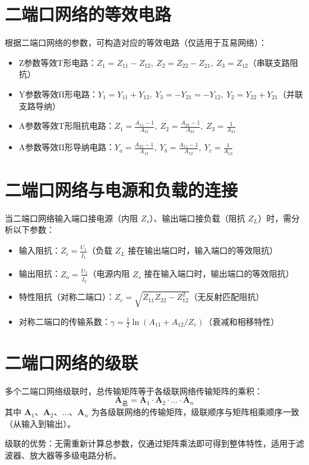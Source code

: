 \section{二端口网络的等效电路}
根据二端口网络的参数，可构造对应的等效电路（仅适用于互易网络）：
\begin{itemize}
    \item Z参数等效T形电路：$Z_1=Z_{11}-Z_{12},\ Z_2=Z_{22}-Z_{21},\ Z_3=Z_{12}$（串联支路阻抗）
    \item Y参数等效Π形电路：$Y_1=Y_{11}+Y_{12},\ Y_3=-Y_{21}=-Y_{12},\ Y_2=Y_{22}+Y_{21}$（并联支路导纳）
    \item A参数等效T形阻抗电路：$Z_1=\frac{A_{11}-1}{A_{21}},\ Z_2=\frac{A_{22}-1}{A_{21}},\ Z_3=\frac{1}{A_{21}}$
    \item A参数等效Π形导纳电路：$Y_a=\frac{A_{22}-1}{A_{12}},\ Y_b=\frac{A_{11}-1}{A_{12}},\ Y_c=\frac{1}{A_{12}}$
\end{itemize}

\section{二端口网络与电源和负载的连接}
当二端口网络输入端口接电源（内阻 $Z_s$）、输出端口接负载（阻抗 $Z_L$）时，需分析以下参数：
\begin{itemize}
    \item 输入阻抗：$Z_i = \frac{\dot{U}_1}{\dot{I}_1}$（负载 $Z_L$ 接在输出端口时，输入端口的等效阻抗）
    \item 输出阻抗：$Z_o = \frac{\dot{U}_2}{\dot{I}_2}$（电源内阻 $Z_s$ 接在输入端口时，输出端口的等效阻抗）
    \item 特性阻抗（对称二端口）：$Z_c = \sqrt{Z_{11}Z_{22} - Z_{12}^2}$（无反射匹配阻抗）
    \item 对称二端口的传输系数：$\gamma = \frac{1}{2}\ln(A_{11} + A_{12}/Z_c)$（衰减和相移特性）
\end{itemize}

\section{二端口网络的级联}
多个二端口网络级联时，总传输矩阵等于各级联网络传输矩阵的乘积：
\[
\mathbf{A}_{\text{总}} = \mathbf{A}_1 \cdot \mathbf{A}_2 \cdot \dots \cdot \mathbf{A}_n
\]
其中 $\mathbf{A}_1\text{、}\mathbf{A}_2\text{、}\dots\text{、}\mathbf{A}_n$ 为各级联网络的传输矩阵，级联顺序与矩阵相乘顺序一致（从输入到输出）。

级联的优势：无需重新计算总参数，仅通过矩阵乘法即可得到整体特性，适用于滤波器、放大器等多级电路分析。